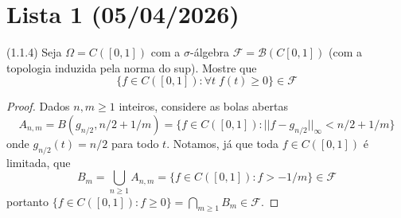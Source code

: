 \section{Lista 1 (05/04/2026)}

\begin{exercise}
	(1.1.4)
	Seja $\Omega = C([0,1])$ com a $\sigma$-álgebra $\mathcal{F} =
	\mathcal{B}(C[0,1])$ (com a topologia induzida
	pela norma do sup). Mostre que
	\[
		\{f \in C([0,1]) : \forall t\; f(t) \geq 0 \} \in \mathcal{F}
	\]
\end{exercise}

\begin{proof}
	Dados $n,m \geq 1$ inteiros, considere as bolas abertas
	\[
		A_{n,m} = B(g_{n/2}, n/2 + 1/m) = \{f \in C([0,1]) : ||f -
		g_{n/2}||_\infty < n/2 + 1/m\}
	\]
	onde $g_{n/2}(t) = n/2$ para todo $t$. Notamos, já que toda $f \in
	C([0,1])$ é limitada, que
	\[
		B_m = \bigcup_{n \geq 1} A_{n,m} = \{f \in C([0,1]) : f > -1/m\}
		\in \mathcal{F}
	\]
	portanto $\{f \in C([0,1]) : f \geq 0\} = \bigcap_{m\geq 1} B_m
	\in \mathcal{F}$.
\end{proof}

